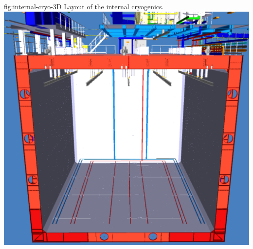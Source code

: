\begin{dunefigure}{fig:internal-cryo-3D}
  {Layout of the internal cryogenics.}
\includegraphics[width=.98\textwidth]{graphics/Internal-Piping-3D.pdf}
\end{dunefigure}

